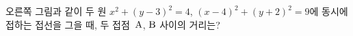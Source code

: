 \noindent\begin{minipage}[t]{0.58\linewidth}\vspace{0pt}\raggedright 오른쪽 그림과 같이 두 원 $x^2+(y-3)^2=4$, $(x-4)^2+(y+2)^2=9$에 동시에 접하는 접선을 그을 때, 두 접점~$\mathrm{A}$, $\mathrm{B}$ 사이의 거리는?\end{minipage}\hfill\begin{minipage}[t]{0.4\linewidth}\vspace{0pt}\centering \resizebox{\ifdim\width>\linewidth\linewidth\else\width\fi}{!}{}\end{minipage}\par
{}
